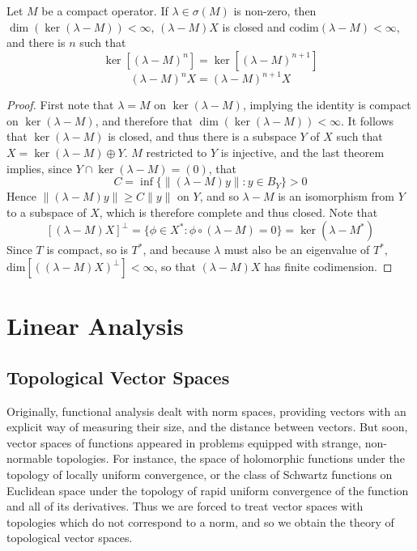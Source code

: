 \begin{corollary}
    Let $M$ be a compact operator. If $\lambda \in \sigma(M)$ is non-zero, then $\dim(\ker(\lambda - M)) < \infty$, $(\lambda - M)X$ is closed and $\text{codim}(\lambda - M) < \infty$, and there is $n$ such that
    \[ \ker[(\lambda - M)^n] = \ker[(\lambda - M)^{n+1}] \]
    \[ (\lambda - M)^n X = (\lambda - M)^{n+1} X \]
\end{corollary}
\begin{proof}
    First note that $\lambda = M$ on $\ker(\lambda - M)$, implying the identity is compact on $\ker(\lambda - M)$, and therefore that $\dim(\ker(\lambda - M)) < \infty$. It follows that $\ker(\lambda - M)$ is closed, and thus there is a subspace $Y$ of $X$ such that $X = \ker(\lambda - M) \oplus Y$. $M$ restricted to $Y$ is injective, and the last theorem implies, since $Y \cap \ker(\lambda - M) = (0)$, that
    \[ C = \inf \{ \| (\lambda - M)y \| : y \in B_Y \} > 0 \]
    Hence $\| (\lambda - M)y \| \geq C \|y\|$ on $Y$, and so $\lambda - M$ is an isomorphism from $Y$ to a subspace of $X$, which is therefore complete and thus closed. Note that
    \[ [(\lambda - M)X]^\perp = \{ \phi \in X^*: \phi \circ (\lambda - M) = 0 \} = \ker( \lambda - M^*) \]
    Since $T$ is compact, so is $T^*$, and because $\lambda$ must also be an eigenvalue of $T^*$, $\text{dim}[((\lambda - M)X)^\perp] < \infty$, so that $(\lambda - M)X$ has finite codimension.
\end{proof}









\part{Linear Analysis}

\chapter{Topological Vector Spaces}

Originally, functional analysis dealt with norm spaces, providing vectors with an explicit way of measuring their size, and the distance between vectors. But soon, vector spaces of functions appeared in problems equipped with strange, non-normable topologies. For instance, the space of holomorphic functions under the topology of locally uniform convergence, or the class of Schwartz functions on Euclidean space under the topology of rapid uniform convergence of the function and all of its derivatives. Thus we are forced to treat vector spaces with topologies which do not correspond to a norm, and so we obtain the theory of topological vector spaces.

